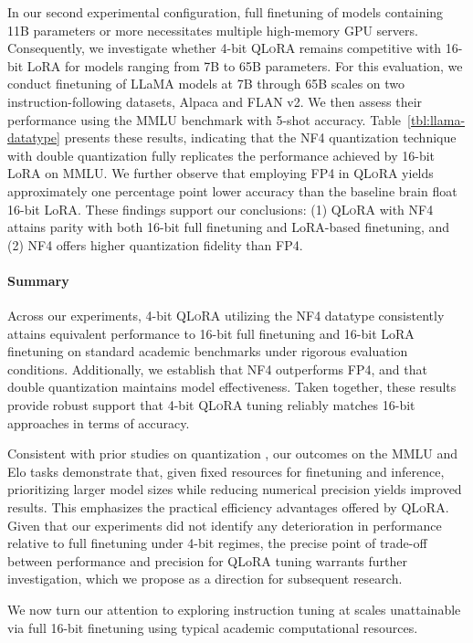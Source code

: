 In our second experimental configuration, full finetuning of models containing 11B parameters or more necessitates multiple high-memory GPU servers. Consequently, we investigate whether 4-bit \textsc{QLoRA} remains competitive with 16-bit LoRA for models ranging from 7B to 65B parameters. For this evaluation, we conduct finetuning of LLaMA models at 7B through 65B scales on two instruction-following datasets, Alpaca and FLAN v2. We then assess their performance using the MMLU benchmark with 5-shot accuracy. Table~\ref{tbl:llama-datatype} presents these results, indicating that the NF4 quantization technique with double quantization fully replicates the performance achieved by 16-bit LoRA on MMLU. We further observe that employing FP4 in \textsc{QLoRA} yields approximately one percentage point lower accuracy than the baseline brain float 16-bit LoRA. These findings support our conclusions: (1) \textsc{QLoRA} with NF4 attains parity with both 16-bit full finetuning and LoRA-based finetuning, and (2) NF4 offers higher quantization fidelity than FP4.

\paragraph{Summary} Across our experiments, 4-bit \textsc{QLoRA} utilizing the NF4 datatype consistently attains equivalent performance to 16-bit full finetuning and 16-bit LoRA finetuning on standard academic benchmarks under rigorous evaluation conditions. Additionally, we establish that NF4 outperforms FP4, and that double quantization maintains model effectiveness. Taken together, these results provide robust support that 4-bit \textsc{QLoRA} tuning reliably matches 16-bit approaches in terms of accuracy.

Consistent with prior studies on quantization \citep{dettmers2022case}, our outcomes on the MMLU and Elo tasks demonstrate that, given fixed resources for finetuning and inference, prioritizing larger model sizes while reducing numerical precision yields improved results. This emphasizes the practical efficiency advantages offered by \textsc{QLoRA}. Given that our experiments did not identify any deterioration in performance relative to full finetuning under 4-bit regimes, the precise point of trade-off between performance and precision for QLoRA tuning warrants further investigation, which we propose as a direction for subsequent research.

We now turn our attention to exploring instruction tuning at scales unattainable via full 16-bit finetuning using typical academic computational resources.

